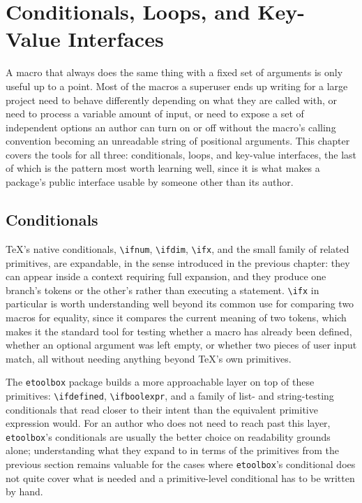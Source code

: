 \hypertarget{chapter-7-conditionals-loops-and-key-value-interfaces}{%
\chapter{Conditionals, Loops, and Key-Value Interfaces}\label{chapter-7-conditionals-loops-and-key-value-interfaces}}

A macro that always does the same thing with a fixed set of arguments is only useful up to a point. Most of the macros a superuser ends up writing for a large project need to behave differently depending on what they are called with, or need to process a variable amount of input, or need to expose a set of independent options an author can turn on or off without the macro's calling convention becoming an unreadable string of positional arguments. This chapter covers the tools for all three: conditionals, loops, and key-value interfaces, the last of which is the pattern most worth learning well, since it is what makes a package's public interface usable by someone other than its author.

\hypertarget{conditionals}{%
\section{Conditionals}\label{conditionals}}

TeX's native conditionals, \texttt{\textbackslash{}ifnum}, \texttt{\textbackslash{}ifdim}, \texttt{\textbackslash{}ifx}, and the small family of related primitives, are expandable, in the sense introduced in the previous chapter: they can appear inside a context requiring full expansion, and they produce one branch's tokens or the other's rather than executing a statement. \texttt{\textbackslash{}ifx} in particular is worth understanding well beyond its common use for comparing two macros for equality, since it compares the current meaning of two tokens, which makes it the standard tool for testing whether a macro has already been defined, whether an optional argument was left empty, or whether two pieces of user input match, all without needing anything beyond TeX's own primitives.

The \texttt{etoolbox} package builds a more approachable layer on top of these primitives: \texttt{\textbackslash{}ifdefined}, \texttt{\textbackslash{}ifboolexpr}, and a family of list- and string-testing conditionals that read closer to their intent than the equivalent primitive expression would. For an author who does not need to reach past this layer, \texttt{etoolbox}'s conditionals are usually the better choice on readability grounds alone; understanding what they expand to in terms of the primitives from the previous section remains valuable for the cases where \texttt{etoolbox}'s conditional does not quite cover what is needed and a primitive-level conditional has to be written by hand.

